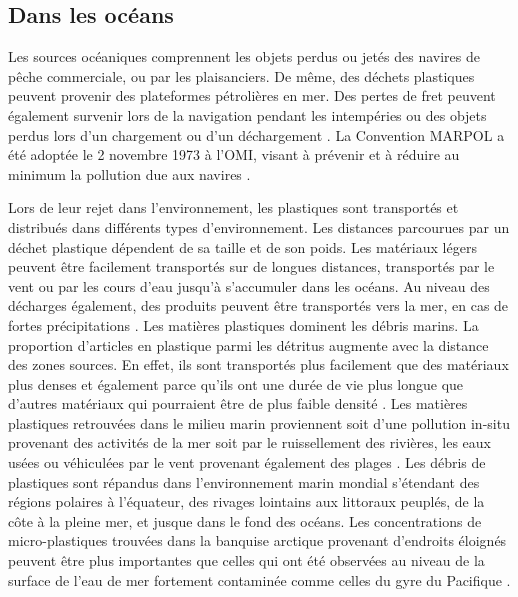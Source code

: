 \subsection{Dans les oc\'eans}
\par{
Les sources oc\'eaniques comprennent les objets perdus ou jet\'es des navires de p\^eche commerciale, ou par les plaisanciers. De m\^eme, des d\'echets plastiques peuvent provenir des plateformes p\'etroli\`eres en mer. Des pertes de fret peuvent \'egalement survenir lors de la navigation pendant les intemp\'eries ou des objets perdus lors d'un chargement ou d'un d\'echargement {\citep{lambert2014occurrence}}. La Convention MARPOL a \'et\'e adopt\'ee le 2 novembre 1973 \`a l'OMI, visant \`a pr\'evenir et \`a r\'eduire au minimum la pollution due aux navires {\citep{OMI}}.
}
\par{
Lors de leur rejet dans l'environnement, les plastiques sont transport\'es et distribu\'es dans diff\'erents types d'environnement. Les distances parcourues par un d\'echet plastique d\'ependent de sa taille et de son poids. Les mat\'eriaux l\'egers peuvent \^etre facilement transport\'es sur de longues distances, transport\'es par le vent ou par les cours d'eau jusqu'\`a s'accumuler dans les oc\'eans. Au niveau des d\'echarges \'egalement, des produits peuvent \^etre transport\'es vers la mer, en cas de fortes pr\'ecipitations {\citep{lambert2014occurrence}}. Les mati\`eres plastiques dominent les d\'ebris marins. La proportion d'articles en plastique parmi les d\'etritus augmente avec la distance des zones sources. En effet, ils sont transport\'es plus facilement que des mat\'eriaux plus denses et \'egalement parce qu'ils ont une dur\'ee de vie plus longue que d'autres mat\'eriaux qui pourraient \^etre de plus faible densit\'e {\citep{ryan2009monitoring}}. Les mati\`eres plastiques retrouv\'ees dans le milieu marin proviennent soit d'une pollution in-situ provenant des activit\'es de la mer soit par le ruissellement des rivi\`eres, les eaux us\'ees ou v\'ehicul\'ees par le vent provenant \'egalement des plages {\citep{ryan2009monitoring}}. Les d\'ebris de plastiques sont r\'epandus dans l'environnement marin mondial s'\'etendant des r\'egions polaires \`a l'\'equateur, des rivages lointains aux littoraux peupl\'es, de la c\^ote \`a la pleine mer, et jusque dans le fond des oc\'eans. Les concentrations de micro-plastiques trouv\'ees dans la banquise arctique provenant d'endroits \'eloign\'es peuvent \^etre plus importantes que celles qui ont \'et\'e observ\'ees au niveau de la surface de l'eau de mer fortement contamin\'ee comme celles du gyre du Pacifique {\citep{wang2016behaviors}}.
}

